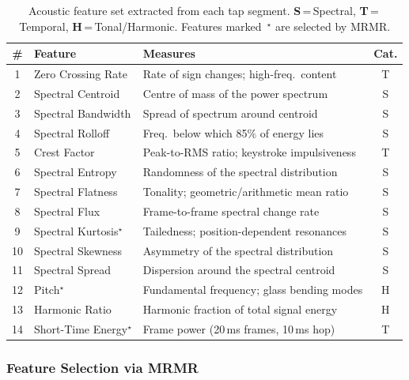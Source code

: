 \documentclass[conference]{IEEEtran}
\begin{document}
\begin{table}[!h]
\centering
\small
\caption{Acoustic feature set extracted from each tap segment.
  \textbf{S}\,=\,Spectral, \textbf{T}\,=\,Temporal,
  \textbf{H}\,=\,Tonal/Harmonic.
  Features marked~$^\star$ are selected by MRMR.}
\label{tab:features}
\setlength{\tabcolsep}{4pt}
\begin{tabular}{clp{3.6cm}c}
\toprule
\textbf{\#} & \textbf{Feature} & \textbf{Measures} & \textbf{Cat.}\\
\midrule
1  & Zero Crossing Rate       & Rate of sign changes; high-freq.\ content         & T \\
2  & Spectral Centroid        & Centre of mass of the power spectrum               & S \\
3  & Spectral Bandwidth       & Spread of spectrum around centroid                 & S \\
4  & Spectral Rolloff         & Freq.\ below which 85\% of energy lies             & S \\
5  & Crest Factor             & Peak-to-RMS ratio; keystroke impulsiveness         & T \\
6  & Spectral Entropy         & Randomness of the spectral distribution            & S \\
7  & Spectral Flatness        & Tonality; geometric/arithmetic mean ratio          & S \\
8  & Spectral Flux            & Frame-to-frame spectral change rate                & S \\
9  & Spectral Kurtosis$^\star$  & Tailedness; position-dependent resonances        & S \\
10 & Spectral Skewness        & Asymmetry of the spectral distribution             & S \\
11 & Spectral Spread          & Dispersion around the spectral centroid            & S \\
12 & Pitch$^\star$            & Fundamental frequency; glass bending modes         & H \\
13 & Harmonic Ratio           & Harmonic fraction of total signal energy           & H \\
14 & Short-Time Energy$^\star$ & Frame power (20\,ms frames, 10\,ms hop)           & T \\
\bottomrule
\end{tabular}
\end{table}

\subsubsection{Feature Selection via MRMR}\label{sec:mrmr}
\end{document}
